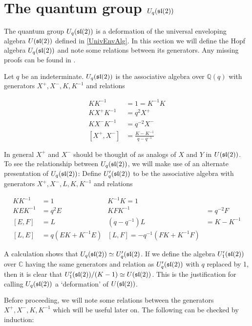 \section{The quantum group $U_q(\mathfrak{sl}(2))$}
\label{UqSL2}


The quantum group $U_q(\mathfrak{sl}(2))$ is a deformation of the universal enveloping
algebra $U(\mathfrak{sl}(2))$ defined in \ref{UnivEnvAlg}.  In this section we will
define the Hopf algebra $U_q(\mathfrak{sl}(2))$ and note some relations between its
generators.  Any missing proofs can be found in \cite{Kassel1994}. 


\begin{defn}
\label{Uqsl2Def}
Let $q$ be an indeterminate. $U_q(\mathfrak{sl}(2))$ is the associative algebra over
$\mathbb{Q}(q)$ with generators $X^+,X^-,K, K^{-1}$ and relations 

\begin{align}
    KK^{-1} &= 1 = K^{-1}K \\
    K X^+ K^{-1} &= q^2  X^+  \\
    KX^-K^{-1} &= q^{-2} X^- \\
    [ X^+ ,X^-] &= \frac{K - K^{-1}}{q - q^{-1}}
\end{align}
\end{defn}

In general $ X^+ $ and $X^-$ should be thought of as analogs of $X$ and $Y$ in
$U(\mathfrak{sl}(2))$. To see the relationship between $U_q(\mathfrak{sl}(2))$, we will make use
of an alternate presentation of $U_q(\mathfrak{sl}(2))$: Define $U'_q(\mathfrak{sl}(2))$ to be
the associative algebra with generators $ X^+ ,X^-,L,K,K^{-1}$ and relations

\begin{align}
    KK^{-1} &= 1 &  K^{-1}K  =1 \\
    KEK^{-1} &= q^2 E & KFK^{-1} &= q^{-2} F \\
    [E,F] &= L  & (q - q^{-1})L &= K-K^{-1} \\
    [L,E] &= q(EK + K^{-1}E) & [L,F] = -q^{-1}(FK + K^{-1}F)
\end{align}

A calculation shows that $U_q(\mathfrak{sl}(2)) \simeq U_q'(\mathfrak{sl}(2)$. If we define the
algebra $U_1'(\mathfrak{sl}(2))$ over $\mathbb{C}$ having the same generators and
relation as $U_q'(\mathfrak{sl}(2))$ with $q$ replaced by 1, then it is clear that
$U_1'(\mathfrak{sl}(2)) /(K-1) \simeq U(\mathfrak{sl}(2))$. This is the justification for calling
$U_q(\mathfrak{sl}(2))$ a `deformation' of $U(\mathfrak{sl}(2))$.

Before proceeding, we will note some relations between the generators
$ X^+ ,X^-,K,K^{-1}$ which will be useful later on. The following can be checked
by induction:

